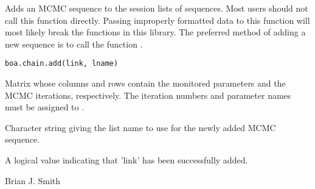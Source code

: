 \begin{Description}\relax
Adds an MCMC sequence to the session lists of sequences. Most users should
not call this function directly. Passing improperly formatted data to this
function will most likely break the functions in this library. The preferred
method of adding a new sequence is to call the function .
\end{Description}
\begin{Usage}
\begin{verbatim}
boa.chain.add(link, lname)
\end{verbatim}
\end{Usage}
\begin{Arguments}
\begin{ldescription}
\item[\code{link}] Matrix whose columns and rows contain the monitored parameters
and the MCMC iterations, respectively. The iteration numbers and parameter
names must be assigned to .
\item[\code{lname}] Character string giving the list name to use for the newly added
MCMC sequence.
\end{ldescription}
\end{Arguments}
\begin{Value}
A logical value indicating that 'link' has been successfully added.
\end{Value}
\begin{Author}\relax
Brian J. Smith
\end{Author}
\begin{SeeAlso}\relax
{}
\end{SeeAlso}

